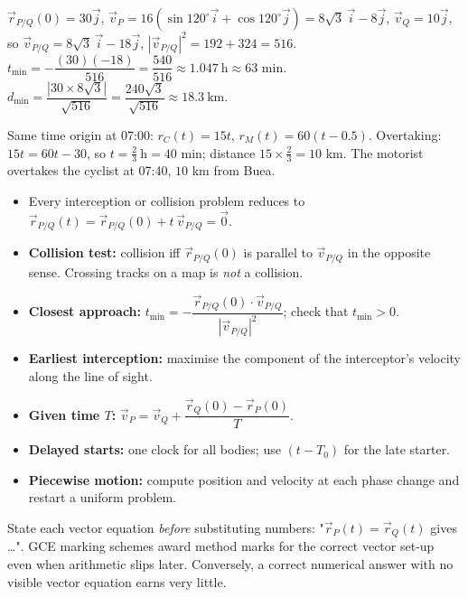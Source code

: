 \documentclass[11pt]{article}
\begin{document}
\begin{corrige}[Exercise 3]
$\vec{r}_{P/Q}(0)=30\vec{j}$, $\vec{v}_P=16(\sin120^{\circ}\vec{i}+\cos120^{\circ}\vec{j})=8\sqrt3\,\vec{i}-8\vec{j}$, $\vec{v}_Q=10\vec{j}$, so $\vec{v}_{P/Q}=8\sqrt3\,\vec{i}-18\vec{j}$, $|\vec{v}_{P/Q}|^{2}=192+324=516$.
$t_{\min}=-\dfrac{(30)(-18)}{516}=\dfrac{540}{516}\approx1.047\ \mathrm{h}\approx63$ min.
$d_{\min}=\dfrac{|30\times 8\sqrt3|}{\sqrt{516}}=\dfrac{240\sqrt3}{\sqrt{516}}\approx18.3\ \mathrm{km}$.
\end{corrige}

\begin{corrige}[Exercise 4]
Same time origin at 07:00: $r_C(t)=15t$, $r_M(t)=60(t-0.5)$. Overtaking: $15t=60t-30$, so $t=\tfrac{2}{3}\ \mathrm{h}=40$ min; distance $15\times\tfrac23=10$ km. The motorist overtakes the cyclist at 07:40, $10$ km from Buea.
\end{corrige}

\begin{aretenir}
\begin{itemize}
\item Every interception or collision problem reduces to $\vec{r}_{P/Q}(t)=\vec{r}_{P/Q}(0)+t\,\vec{v}_{P/Q}=\vec{0}$.
\item \textbf{Collision test:} collision iff $\vec{r}_{P/Q}(0)$ is parallel to $\vec{v}_{P/Q}$ in the opposite sense. Crossing tracks on a map is \emph{not} a collision.
\item \textbf{Closest approach:} $t_{\min}=-\dfrac{\vec{r}_{P/Q}(0)\cdot\vec{v}_{P/Q}}{|\vec{v}_{P/Q}|^{2}}$; check that $t_{\min}>0$.
\item \textbf{Earliest interception:} maximise the component of the interceptor's velocity along the line of sight.
\item \textbf{Given time $T$:} $\vec{v}_P=\vec{v}_Q+\dfrac{\vec{r}_Q(0)-\vec{r}_P(0)}{T}$.
\item \textbf{Delayed starts:} one clock for all bodies; use $(t-T_0)$ for the late starter.
\item \textbf{Piecewise motion:} compute position and velocity at each phase change and restart a uniform problem.
\end{itemize}
\end{aretenir}

\begin{attention}
State each vector equation \emph{before} substituting numbers: "$\vec{r}_P(t)=\vec{r}_Q(t)$ gives \dots". GCE marking schemes award method marks for the correct vector set-up even when arithmetic slips later. Conversely, a correct numerical answer with no visible vector equation earns very little.
\end{attention}
\end{document}
